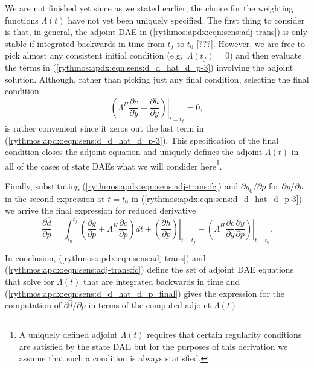 \documentclass[pdf,ps2pdf,11pt]{SANDreport}
\begin{document}
%
We are not finished yet since as we stated earlier, the choice for the
weighting functions $\Lambda(t)$ have not yet been uniquely specified.
The first thing to consider is that, in general, the adjoint DAE in
(\ref{rythmos:apdx:eqn:sens:adj-trans}) is only stable if integrated
backwards in time from $t_f$ to $t_0$ [???].  However, we are free to
pick almost any consistent initial condition (e.g.\ $\Lambda(t_f)=0$)
and then evaluate the terms in
(\ref{rythmos:apdx:eqn:sens:d_d_hat_d_p-3}) involving the adjoint
solution.  Although, rather than picking just any final condition,
selecting the final condition
%
\begin{equation}
\left. \left(
  \Lambda^H \frac{\partial c}{\partial \dot{y}}
  +  \frac{\partial h}{\partial y}
\right) \right|_{t=t_f}
 = 0,
\label{rythmos:apdx:eqn:sens:adj-trans:fc}
\end{equation}
%
is rather convenient since it zeros out the last term in
(\ref{rythmos:apdx:eqn:sens:d_d_hat_d_p-3}).  This specification of
the final condition closes the adjoint equation and uniquely defines
the adjoint $\Lambda(t)$ in all of the cases of state DAEs what we
will condider here\footnote{A uniquely defined adjoint $\Lambda(t)$
requires that certain regularity conditions are satisfied by the state
DAE but for the purposes of this derivation we assume that such a
condition is always statisfied.}.

Finally, substituting (\ref{rythmos:apdx:eqn:sens:adj-trans:fc}) and
$\partial y_0 / {}\partial p$ for $\partial y / {}\partial p$ in the
second expression at $t=t_0$ in
(\ref{rythmos:apdx:eqn:sens:d_d_hat_d_p-3}) we arrive the final
expression for reduced derivative
%
%
\begin{equation}
\frac{\partial \hat{d}}{\partial p} =
\int_{t_0}^{t_f} \left(
    \frac{\partial g}{\partial p}
    + \Lambda^H \frac{\partial c}{\partial p}
  \right) dt
  + \left. \left( \frac{\partial h}{\partial p} \right) \right|_{t=t_f}
  - \left. \left( \Lambda^H \frac{\partial c}{\partial \dot{y}} \frac{\partial y}{\partial p} \right) \right|_{t=t_0}.
\label{rythmos:apdx:eqn:sens:d_d_hat_d_p_final}
\end{equation}

In conclusion, (\ref{rythmos:apdx:eqn:sens:adj-trans}) and
(\ref{rythmos:apdx:eqn:sens:adj-trans:fc}) define the set of adjoint DAE
equations that solve for $\Lambda(t)$ that are integrated backwards in time
and (\ref{rythmos:apdx:eqn:sens:d_d_hat_d_p_final}) gives the expression for
the computation of $\partial {}\hat{d} / {}\partial p$ in terms of the
computed adjoint $\Lambda(t)$.
\end{document}

